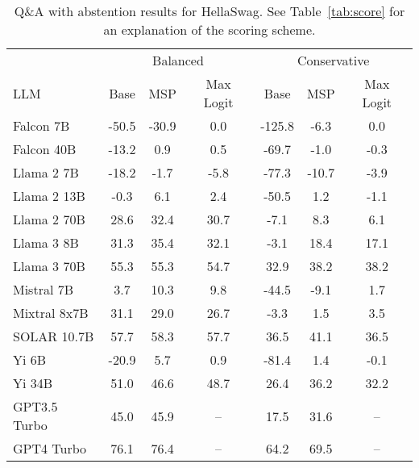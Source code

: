 \begin{table*}[h]
\centering
\caption{Q\&A with abstention results for HellaSwag. See Table~\ref{tab:score} for an explanation of the scoring scheme.}
\label{tab:hellaswag_score}
\begin{tabular}{lcccccc}
\toprule
& \multicolumn{3}{c}{Balanced} & \multicolumn{3}{c}{Conservative} \\ 
LLM & Base & MSP & Max Logit & Base & MSP & Max Logit \\ 
\cmidrule(lr){1-1}\cmidrule(lr){2-4}\cmidrule(lr){5-7} 
Falcon 7B & -50.5 & -30.9 & 0.0 & -125.8 & -6.3 & 0.0\\
Falcon 40B & -13.2 & 0.9 & 0.5 & -69.7 & -1.0 & -0.3\\
Llama 2 7B & -18.2 & -1.7 & -5.8 & -77.3 & -10.7 & -3.9\\
Llama 2 13B & -0.3 & 6.1 & 2.4 & -50.5 & 1.2 & -1.1\\
Llama 2 70B & 28.6 & 32.4 & 30.7 & -7.1 & 8.3 & 6.1\\
Llama 3 8B & 31.3 & 35.4 & 32.1 & -3.1 & 18.4 & 17.1\\
Llama 3 70B & 55.3 & 55.3 & 54.7 & 32.9 & 38.2 & 38.2\\
Mistral 7B & 3.7 & 10.3 & 9.8 & -44.5 & -9.1 & 1.7\\
Mixtral 8x7B & 31.1 & 29.0 & 26.7 & -3.3 & 1.5 & 3.5\\
SOLAR 10.7B & 57.7 & 58.3 & 57.7 & 36.5 & 41.1 & 36.5\\
Yi 6B & -20.9 & 5.7 & 0.9 & -81.4 & 1.4 & -0.1\\
Yi 34B & 51.0 & 46.6 & 48.7 & 26.4 & 36.2 & 32.2\\
GPT3.5 Turbo & 45.0 & 45.9 & -- & 17.5 & 31.6 & --\\
GPT4 Turbo & 76.1 & 76.4 & -- & 64.2 & 69.5 & --\\
\bottomrule
\end{tabular}
\end{table*}
